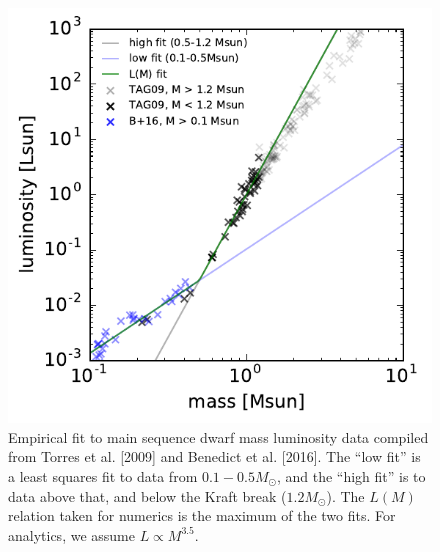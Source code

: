 \documentclass{emulateapj}
\begin{document}
\newpage
\appendix
\begin{figure}[!t]
    \begin{center}
        \includegraphics[scale=0.9]{figures/mass_luminosity.pdf}
    \end{center}
    \caption{Empirical fit to main sequence dwarf mass luminosity data 
    compiled 
        from Torres et al. [2009] and Benedict et al. [2016]. The ``low fit'' 
        is a 
        least squares fit to data from $0.1-0.5M_\odot$, and the ``high fit'' 
        is 
        to 
        data above that, and below the Kraft break ($1.2M_\odot$).
        The $L(M)$ relation taken for numerics is the maximum 
        of the two fits. For analytics, we assume $L\propto M^{3.5}$.
    }
    \label{fig:mass_luminosity}
\end{figure}
\end{document}
